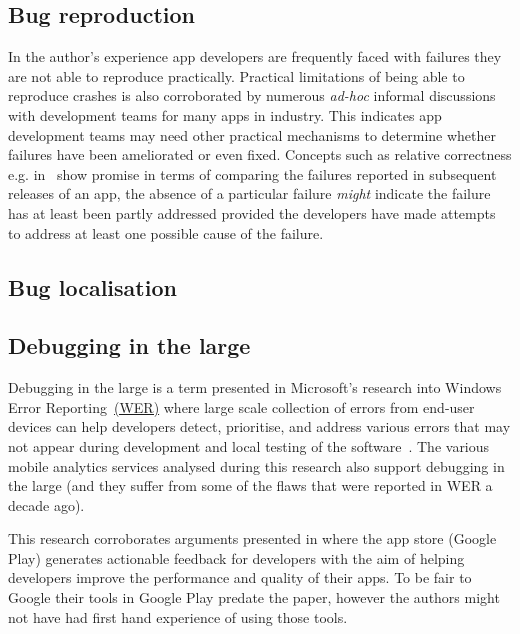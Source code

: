 \subsection{Bug reproduction}
In the author's experience app developers are frequently faced with failures they are not able to reproduce practically. Practical limitations of being able to reproduce crashes is also corroborated by numerous \textit{ad-hoc} informal discussions with development teams for many apps in industry. This indicates app development teams may need other practical mechanisms to determine whether failures have been ameliorated or even fixed. Concepts such as relative correctness e.g. in~ show promise in terms of comparing the failures reported in subsequent releases of an app, the absence of a particular failure \textit{might} indicate the failure has at least been partly addressed provided the developers have made attempts to address at least one possible cause of the failure.


\subsection{Bug localisation}


\subsection{Debugging in the large}
Debugging in the large is a term presented in Microsoft's research into Windows Error Reporting~\href{glossary-wer}{(WER)} where large scale collection of errors from end-user devices can help developers detect, prioritise, and address various errors that may not appear during development and local testing of the software~. The various mobile analytics services analysed during this research also support debugging in the large (and they suffer from some of the flaws that were reported in WER a decade ago). 

This research corroborates arguments presented in  where the app store (Google Play) generates actionable feedback for developers with the aim of helping developers improve the performance and quality of their apps. To be fair to Google their tools in Google Play predate the paper, however the authors might not have had first hand experience of using those tools. %

